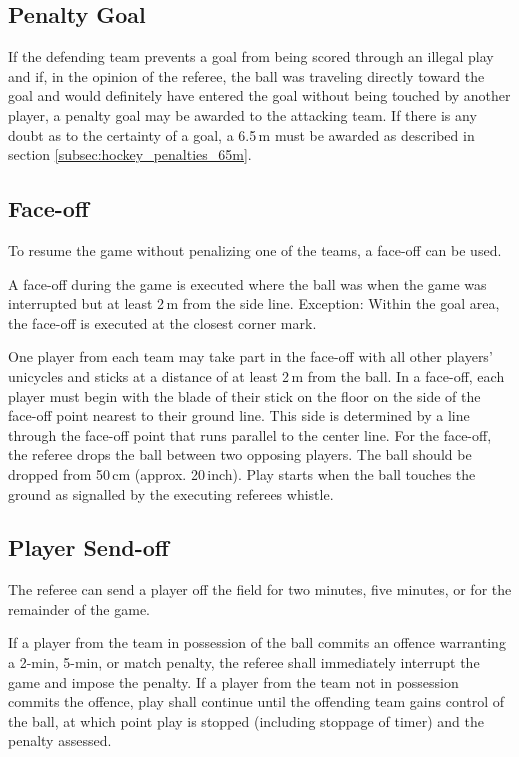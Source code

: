 \subsection{Penalty Goal}\label{subsec:hockey_penalties_penalty_goal}
If the defending team prevents a goal from being scored through an illegal play and if, in the opinion of the referee, the ball was traveling directly toward the goal and would definitely have entered the goal without being touched by another player, a penalty goal may be awarded to the attacking team.
If there is any doubt as to the certainty of a goal, a 6.5\,m must be awarded as described in section \ref{subsec:hockey_penalties_65m}.

\subsection{Face-off \label{subsec:hockey_penalties_face-off}}
To resume the game without penalizing one of the teams, a face-off can be used.

A face-off during the game is executed where the ball was when the game was interrupted but at least 2\,m from the side line.
Exception: Within the goal area, the face-off is executed at the closest corner mark.

One player from each team may take part in the face-off with all other players' unicycles and sticks at a distance of at least 2\,m from the ball.
In a face-off, each player must begin with the blade of their stick on the floor on the side of the face-off point nearest to their ground line.
This side is determined by a line through the face-off point that runs parallel to the center line.
For the face-off, the referee drops the ball between two opposing players.
The ball should be dropped from 50\,cm (approx. 20\,inch).
Play starts when the ball touches the ground as signalled by the executing referees whistle.

\subsection{Player Send-off}\label{subsec:hockey_penalties_player_send-off}
The referee can send a player off the field for two minutes, five minutes, or for the remainder of the game.

If a player from the team in possession of the ball commits an offence warranting a 2-min, 5-min, or match penalty, the referee shall immediately interrupt the game and impose the penalty.
If a player from the team not in possession commits the offence, play shall continue until the offending team gains control of the ball, at which point play is stopped (including stoppage of timer) and the penalty assessed.


